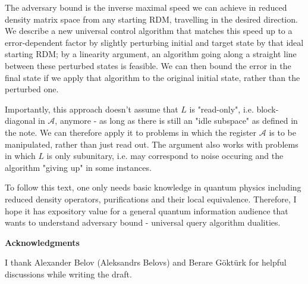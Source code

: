 \documentclass{article}
\begin{document}
The adversary bound is the inverse maximal speed we can achieve in reduced density matrix space from any starting RDM, travelling in the desired direction. We describe a new universal control algorithm that matches this speed up to a error-dependent factor by slightly perturbing initial and target state by that ideal starting RDM; by a linearity argument, an algorithm going along a straight line between these perturbed states is feasible. We can then bound the error in the final state if we apply that algorithm to the original initial state, rather than the perturbed one.



Importantly, this approach doesn't assume that $\displaystyle L$ is "read-only", i.e. block-diagonal in $\displaystyle \mathcal{A}$, anymore - as long as there is still an "idle subspace" as defined in the note. We can therefore apply it to problems in which the register $\displaystyle \mathcal{A}$ is to be manipulated, rather than just read out. The argument also works with problems in which $\displaystyle L$ is only subunitary, i.e. may correspond to noise occuring and the algorithm "giving up" in some instances.



To follow this text, one only needs basic knowledge in quantum physics including reduced density operators, purifications and their local equivalence. Therefore, I hope it has expository value for a general quantum information audience that wants to understand adversary bound - universal query algorithm dualities.



\textbf{Acknowledgments}

I thank Alexander Belov (Aleksandrs Belovs) and Berare Göktürk for helpful discussions while writing the draft.



\tableofcontents
\end{document}
